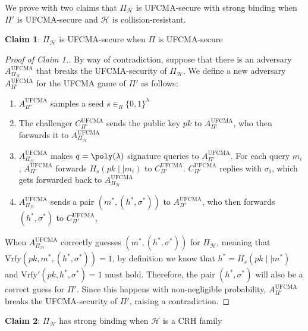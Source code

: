 \documentclass[a4paper, 12pt]{report}
\begin{document}
    We prove with two claims that $\Pi_{\mathcal{H}}$ is UFCMA-secure with strong binding when $\Pi'$ is UFCMA-secure and $\mathcal{H}$ is collision-resistant.

    \textbf{Claim 1}: $\Pi_{\mathcal{H}}$ is UFCMA-secure when $\Pi$ is UFCMA-secure

    \begin{proof}[Proof of Claim 1.]
        By way of contradiction, suppose that there is an adversary $A^{\text{UFCMA}}_{\Pi_{\mathcal{H}}}$ that breaks the UFCMA-security of $\Pi_{\mathcal{H}}$. We define a new adversary $A^{\text{UFCMA}}_{\Pi'}$ for the UFCMA game of $\Pi'$ as follows:
        \begin{enumerate}
            \item $A^{\text{UFCMA}}_{\Pi'}$ samples a seed $s \in_R \{0,1\}^{\lambda}$
            \item The challenger $C^{\text{UFCMA}}_{\Pi'}$ sends the public key $pk$ to $A^{\text{UFCMA}}_{\Pi'}$, who then forwards it to $A^{\text{UFCMA}}_{\Pi_{\mathcal{H}}}$
            \item $A^{\text{UFCMA}}_{\Pi_{\mathcal{H}}}$ makes $q = \poly(\lambda)$ signature queries to $A^{\text{UFCMA}}_{\Pi'}$. For each query $m_i$, $A^{\text{UFCMA}}_{\Pi'}$ forwards $H_s(pk \mid\mid m_i)$ to $C^{\text{UFCMA}}_{\Pi'}$. $C^{\text{UFCMA}}_{\Pi'}$ replies with $\sigma_i$, which gets forwarded back to $A^{\text{UFCMA}}_{\Pi_{\mathcal{H}}}$
            \item $A^{\text{UFCMA}}_{\Pi_{\mathcal{H}}}$ sends a pair $(m^*, (h^*,  \sigma^*))$ to $A^{\text{UFCMA}}_{\Pi'}$, who then forwards $(h^*, \sigma^*)$ to $C^{\text{UFCMA}}_{\Pi'}$,
        \end{enumerate}

        When $A^{\text{UFCMA}}_{\Pi_{\mathcal{H}}}$ correctly guesses $(m^*, (h^*,\sigma^*))$ for $\Pi_{\mathcal{H}}$, meaning that $\mathrm{Vrfy}(pk, m^*, (h^*, \sigma^*)) = 1$, by definition we know that $h^* = H_s(pk \mid\mid m^*)$ and $\mathrm{Vrfy}'(pk, h^*, \sigma^*) = 1$ must hold. Therefore, the pair $(h^*, \sigma^*)$ will also be a correct guess for $\Pi'$. Since this happens with non-negligible probability, $A^{\text{UFCMA}}_{\Pi'}$ breaks the UFCMA-security of $\Pi'$, raising a contradiction.
    \end{proof}

    \textbf{Claim 2}: $\Pi_{\mathcal{H}}$ has strong binding when $\mathcal{H}$ is a CRH family
\end{document}
